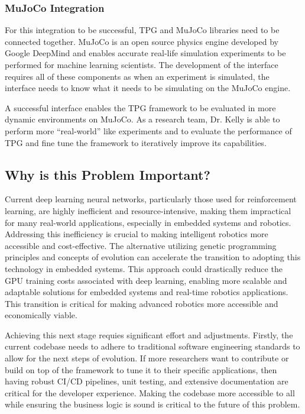 \documentclass{article}
\begin{document}
\subsubsection{MuJoCo Integration}

For this integration to be successful, TPG and MuJoCo libraries need to be connected together. MuJoCo is an open source physics engine developed by Google DeepMind and enables accurate real-life simulation experiments to be performed for machine learning scientists. The development of the interface requires all of these components as when an experiment is simulated, the interface needs to know what it needs to be simulating on the MuJoCo engine. 

A successful interface enables the TPG framework to be evaluated in more dynamic environments on MuJoCo. As a research team, Dr. Kelly is able to perform more “real-world” like experiments and to evaluate the performance of TPG and fine tune the framework to iteratively improve its capabilities.

\subsection{Why is this Problem Important?}
Current deep learning neural networks, particularly those used for reinforcement learning, are highly inefficient and resource-intensive, making them impractical for many real-world applications, especially in embedded systems and robotics. Addressing this inefficiency is crucial to making intelligent robotics more accessible and cost-effective.  The alternative utilizing genetic programming principles and concepts of evolution can accelerate the transition to adopting this technology in embedded systems. This approach could drastically reduce the GPU training costs associated with deep learning, enabling more scalable and adaptable solutions for embedded systems and real-time robotics applications. This transition is critical for making advanced robotics more accessible and economically viable.

Achieving this next stage requies significant effort and adjustments. Firstly, the current codebase needs to adhere to traditional software engineering standards to allow for the next steps of evolution. If more researchers want to contribute or build on top of the framework to tune it to their specific applications, then having robust CI/CD pipelines, unit testing, and extensive documentation are critical for the developer experience. Making the codebase more accessible to all while ensuring the business logic is sound is critical to the future of this problem. 
\end{document}
